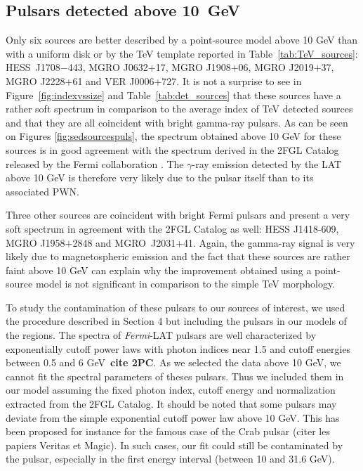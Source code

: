 \subsection{Pulsars detected above 10~GeV}
\label{pulsarsect}
Only six sources are better described by a point-source model above 10 GeV than with a uniform disk or by the TeV template reported in Table~\ref{tab:TeV_sources}: HESS~J1708$-$443, MGRO J0632+17, MGRO J1908$+$06, MGRO J2019$+$37, MGRO J2228+61 and VER J0006+727. It is not a surprise to see in Figure~\ref{fig:indexvssize} and Table~\ref{tab:det_sources} that these sources have a rather soft spectrum in comparison to the average index of TeV detected sources and that they are all coincident with bright gamma-ray pulsars. As can be seen on Figures \ref{fig:sedsourcespuls}, the spectrum obtained above 10 GeV for these sources is in good agreement with the spectrum derived in the 2FGL Catalog released by the Fermi collaboration \citep{2012ApJS..199...31N}. The $\gamma$-ray emission detected by the LAT above 10 GeV is therefore very likely due to the pulsar itself than to its associated PWN. 

Three other sources are coincident with bright Fermi pulsars and present a very soft spectrum in agreement with the 2FGL Catalog as well: HESS J1418-609, MGRO J1958$+$2848 and MGRO~J2031+41. Again, the gamma-ray signal is very likely due to magnetospheric emission and the fact that these sources are rather faint above 10 GeV can explain why the improvement obtained using a point-source model is not significant in comparison to the simple TeV morphology.

To study the contamination of these pulsars to our sources of interest, we used the procedure described in Section 4 but including the pulsars in our models of the regions. The spectra of \emph{Fermi}-LAT pulsars are well characterized by exponentially cutoff power laws with photon indices near 1.5 and cutoff energies between 0.5 and 6 GeV~\textbf{cite 2PC}. As we selected the data above 10 GeV, we cannot fit the spectral parameters of theses pulsars. Thus we included them in our model assuming the fixed photon index, cutoff energy and normalization extracted from the 2FGL Catalog. It should be noted that some pulsars may deviate from the simple exponential cutoff power law above 10 GeV. This has been proposed for instance for the famous case of the Crab pulsar (citer les papiers Veritas et Magic). In such cases, our fit could still be contaminated by the pulsar, especially in the first energy interval (between 10 and 31.6 GeV).

